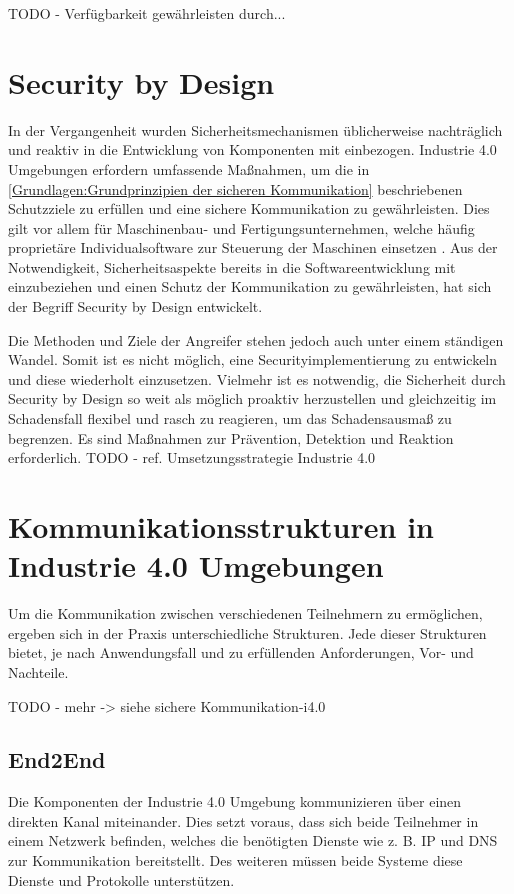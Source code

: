 TODO - Verfügbarkeit gewährleisten durch...

\section{Security by Design}
In der Vergangenheit wurden Sicherheitsmechanismen üblicherweise nachträglich und reaktiv in die Entwicklung von Komponenten mit einbezogen. Industrie 4.0 Umgebungen erfordern umfassende Maßnahmen, um die in \autoref{Grundlagen:Grundprinzipien der sicheren Kommunikation} beschriebenen Schutzziele zu erfüllen und eine sichere Kommunikation zu gewährleisten. Dies gilt vor allem für Maschinenbau- und Fertigungsunternehmen, welche häufig proprietäre Individualsoftware zur Steuerung der Maschinen einsetzen \cite{DTAG2016}. Aus der Notwendigkeit, Sicherheitsaspekte bereits in die Softwareentwicklung mit einzubeziehen und einen Schutz der Kommunikation zu gewährleisten, hat sich der Begriff Security by Design entwickelt.

Die Methoden und Ziele der Angreifer stehen jedoch auch unter einem ständigen Wandel. Somit ist es nicht möglich, eine Securityimplementierung zu entwickeln und diese wiederholt einzusetzen. Vielmehr ist es notwendig, die Sicherheit durch Security by Design so weit als möglich proaktiv herzustellen und gleichzeitig im Schadensfall flexibel und rasch zu reagieren, um das Schadensausmaß zu begrenzen. Es sind Maßnahmen zur Prävention, Detektion und Reaktion erforderlich. TODO - ref. Umsetzungsstrategie Industrie 4.0

\section{Kommunikationsstrukturen in Industrie 4.0 Umgebungen}
Um die Kommunikation zwischen verschiedenen Teilnehmern zu ermöglichen, ergeben sich in der Praxis unterschiedliche Strukturen. Jede dieser Strukturen bietet, je nach Anwendungsfall und zu erfüllenden Anforderungen, Vor- und Nachteile.

TODO - mehr -> siehe sichere Kommunikation-i4.0

\subsection{End2End}
Die Komponenten der Industrie 4.0 Umgebung kommunizieren über einen direkten Kanal miteinander. Dies setzt voraus, dass sich beide Teilnehmer in einem Netzwerk befinden, welches die benötigten Dienste wie z. B. \ac{IP} und \ac{DNS} zur Kommunikation bereitstellt. Des weiteren müssen beide Systeme diese Dienste und Protokolle unterstützen.

